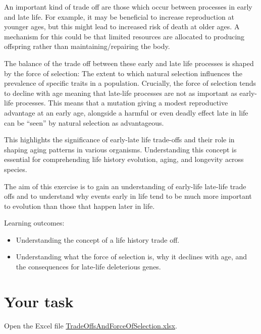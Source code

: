 \documentclass[
  a4paper]{book}
\providecommand{\tightlist}{%
  \setlength{\itemsep}{0pt}\setlength{\parskip}{0pt}}
\begin{document}
An important kind of trade off are those which occur between processes in early and late life. For example, it may be beneficial to increase reproduction at younger ages, but this might lead to increased risk of death at older ages. A mechanism for this could be that limited resources are allocated to producing offspring rather than maintaining/repairing the body.

The balance of the trade off between these early and late life processes is shaped by the force of selection: The extent to which natural selection influences the prevalence of specific traits in a population. Crucially, the force of selection tends to decline with age meaning that late-life processes are not as important as early-life processes. This means that a mutation giving a modest reproductive advantage at an early age, alongside a harmful or even deadly effect late in life can be ``seen'' by natural selection as advantageous.

This highlights the significance of early-late life trade-offs and their role in shaping aging patterns in various organisms. Understanding this concept is essential for comprehending life history evolution, aging, and longevity across species.

The aim of this exercise is to gain an understanding of early-life late-life trade offs and to understand why events early in life tend to be much more important to evolution than those that happen later in life.

\begin{do-something}
Learning outcomes:

\begin{itemize}
\tightlist
\item
  Understanding the concept of a life history trade off.
\item
  Understanding what the force of selection is, why it declines with
  age, and the consequences for late-life deleterious genes.
\end{itemize}
\end{do-something}

\hypertarget{your-task-8}{%
\section{Your task}\label{your-task-8}}

Open the Excel file \href{https://www.dropbox.com/s/7eyoencvqc3hwv7/TradeOffsAndForceOfSelection.xlsx?dl=1}{TradeOffsAndForceOfSelection.xlsx}.
\end{document}
